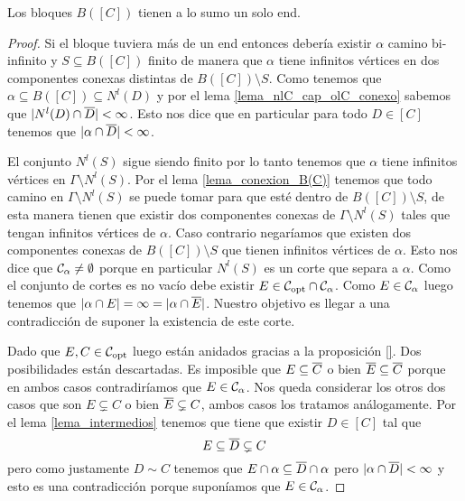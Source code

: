 \documentclass[tesis.tex]{subfiles}
\begin{document}
\begin{lema}\label{lema_bloques_1_end}
	Los bloques $B([C])$ tienen a lo sumo un solo end.
\end{lema}
\begin{proof}
	Si el bloque tuviera más de un end entonces debería existir $\alpha$ camino bi-infinito y $S \subseteq B([C])$ finito de manera que $\alpha$ tiene infinitos vértices en dos componentes conexas distintas de $B([C]) \setminus S$.
	Como tenemos que $\alpha \subseteq B([C]) \subseteq N^l(D)$ y por el lema \ref{lema_nlC_cap_olC_conexo} sabemos que $|N^l(D) \cap \overline D | < \infty$.
	Esto nos dice que en particular para todo $D \in [C]$ tenemos que $|\alpha \cap \overline D| < \infty$.
	
	El conjunto $N^l(S)$ sigue siendo finito por lo tanto tenemos que $\alpha$ tiene infinitos vértices en $\Gamma \setminus N^l(S)$.
	Por el lema \ref{lema_conexion_B(C)} tenemos que todo camino en $\Gamma \setminus N^l(S)$ se puede tomar para que esté dentro de $B([C]) \setminus S$, de esta manera tienen que existir dos componentes conexas de $\Gamma \setminus N^l(S)$ tales que tengan infinitos vértices de $\alpha$. 
	Caso contrario negaríamos que existen dos componentes conexas de $B([C]) \setminus S$ que tienen infinitos vértices de $\alpha$.
	Esto nos dice que ${\cal C}_{\alpha} \neq \emptyset$ porque en particular $N^l(S)$ es un corte que separa a $\alpha$.
	Como el conjunto de cortes es no vacío debe existir $E \in {\cal C}_{\text{opt}} \cap {\cal C}_{\alpha}$.
	Como $E \in {\cal C}_{\alpha}$ luego tenemos que $|\alpha \cap E| = \infty = |\alpha \cap \overline E|$.
	Nuestro objetivo es llegar a una contradicción de suponer la existencia de este corte. 	
	
	Dado que $E,C \in {\cal C}_{\text{opt}}$ luego están anidados gracias a la proposición \ref{}.
	Dos posibilidades están descartadas. 
	Es imposible que $E \subseteq \overline C$ o bien $\overline E \subseteq \overline C$ porque en ambos casos contradiríamos que $E \in {\cal C}_{\alpha}$.
	Nos queda considerar los otros dos casos que son $E \subsetneq C$ o bien $\overline E \subsetneq C$, ambos casos los tratamos análogamente.
	Por el lema \ref{lema_intermedios} tenemos que tiene que existir $D \in [C]$ tal que 
	\[
		E \subseteq \overline D \subsetneq C
	\]
	pero como justamente $D \sim C$ tenemos que $E \cap \alpha \subseteq \overline D \cap \alpha$ pero $|\alpha \cap \overline D| < \infty$ y esto es una contradicción porque suponíamos que $E \in {\cal C}_{\alpha}$.
\end{proof}
\end{document}
